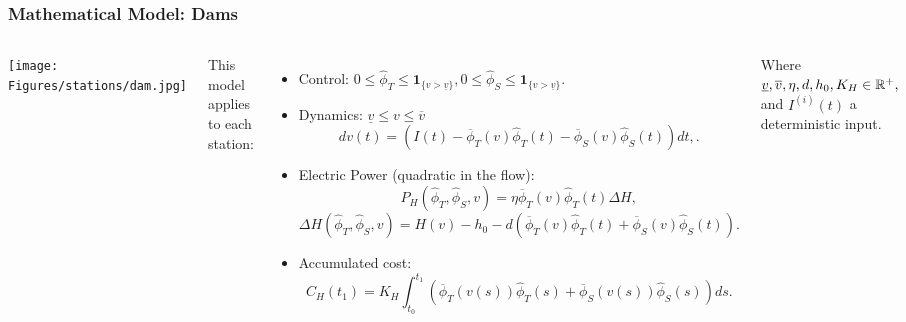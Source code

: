 
\begin{frame}
\frametitle{Mathematical Model: Dams}

\begin{columns}[c]

\texttt{[image: Figures/stations/dam.jpg]}\\

{\footnotesize This model applies to each station:
\begin{itemize}
\item Control: $0\leq\hat{\phi}_T\leq\mathbf{1}_{\{v>\underline{v}\}},0\leq\hat{\phi}_S\leq\mathbf{1}_{\{v>\underline{v}\}}$.
\item Dynamics: $\underline{v}\leq v\leq\overline{v}$
\begin{equation*}
dv(t)=\left(I(t)-\overline{\phi}_T(v)\hat{\phi}_T(t)-\overline{\phi}_S(v)\hat{\phi}_S(t)\right)dt,.
\end{equation*}
\item Electric Power (quadratic in the flow):
\begin{equation*}
P_H\left(\hat{\phi}_T,\hat{\phi}_S,v\right)=\eta\overline{\phi}_T(v)\hat{\phi}_T(t)\Delta H,
\end{equation*}
\begin{equation*}
\Delta H\left(\hat{\phi}_T,\hat{\phi}_S,v\right)=H(v)-h_0-d\left(\overline{\phi}_T(v)\hat{\phi}_T(t)+\overline{\phi}_S(v)\hat{\phi}_S(t)\right).
\end{equation*}
\item Accumulated cost:
\begin{equation*}
C_H(t_1)=K_H\int_{t_0}^{t_1}\left(\overline{\phi}_T(v(s))\hat{\phi}_T(s)+\overline{\phi}_S(v(s))\hat{\phi}_S(s)\right)ds.
\end{equation*}
\end{itemize}
Where $\underline{v},\overline{v},\eta,d,h_0,K_H\in\mathbb{R}^+,$ and $I^{(i)}(t)$ a deterministic input.}

\end{columns}
\end{frame}

